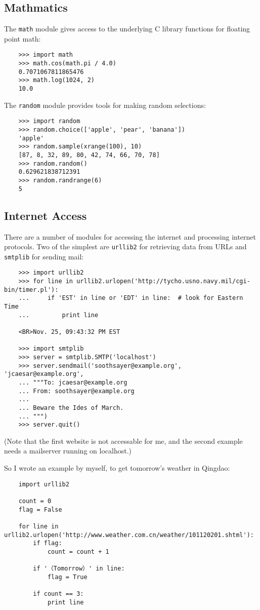 \documentclass[UTF8]{article}
\begin{document}
\subsection{Mathmatics}
The \texttt{math} module gives access to the underlying C library functions for floating point math:
\begin{verbatim}
    >>> import math
    >>> math.cos(math.pi / 4.0)
    0.7071067811865476
    >>> math.log(1024, 2)
    10.0
\end{verbatim}

The \texttt{random} module provides tools for making random selections:
\begin{verbatim}
    >>> import random
    >>> random.choice(['apple', 'pear', 'banana'])
    'apple'
    >>> random.sample(xrange(100), 10)
    [87, 8, 32, 89, 80, 42, 74, 66, 70, 78]
    >>> random.random()
    0.629621838712391
    >>> random.randrange(6)
    5
\end{verbatim}

\subsection{Internet Access}
There are a number of modules for accessing the internet and processing internet protocols. Two of
the simplest are \texttt{urllib2} for retrieving data from URLs and \texttt{smtplib} for sending
mail:
\begin{verbatim}
    >>> import urllib2
    >>> for line in urllib2.urlopen('http://tycho.usno.navy.mil/cgi-bin/timer.pl'):
    ...     if 'EST' in line or 'EDT' in line:  # look for Eastern Time
    ...         print line

    <BR>Nov. 25, 09:43:32 PM EST

    >>> import smtplib
    >>> server = smtplib.SMTP('localhost')
    >>> server.sendmail('soothsayer@example.org', 'jcaesar@example.org',
    ... """To: jcaesar@example.org
    ... From: soothsayer@example.org
    ...
    ... Beware the Ides of March.
    ... """)
    >>> server.quit()
\end{verbatim}
(Note that the first website is not accessable for me, and the second example needs a mailserver
running on localhost.)

So I wrote an example by myself, to get tomorrow's weather in Qingdao:
\begin{verbatim}
    import urllib2

    count = 0
    flag = False

    for line in urllib2.urlopen('http://www.weather.com.cn/weather/101120201.shtml'):
        if flag:
            count = count + 1

        if '（Tomorrow）' in line:
            flag = True

        if count == 3:
            print line
\end{verbatim}
\end{document}
